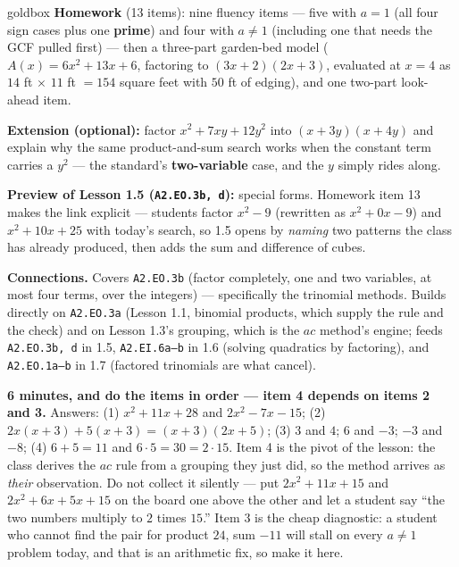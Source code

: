 \documentclass[10pt]{article}
\begin{document}
\boxguard[18]
\begin{skillbox}{goldbox}
\textbf{Homework} (13 items): nine fluency items --- five with $a=1$ (all four sign cases plus one
\textbf{prime}) and four with $a \ne 1$ (including one that needs the GCF pulled first) --- then a
three-part garden-bed model ($A(x)=6x^2+13x+6$, factoring to $(3x+2)(2x+3)$, evaluated at $x=4$ as
$14$ ft $\times$ $11$ ft $=154$ square feet with $50$ ft of edging), and one two-part look-ahead
item.

\textbf{Extension (optional):} factor $x^2+7xy+12y^2$ into $(x+3y)(x+4y)$ and explain why the same
product-and-sum search works when the constant term carries a $y^2$ --- the standard's
\textbf{two-variable} case, and the $y$ simply rides along.

\textbf{Preview of Lesson 1.5 (\texttt{A2.EO.3b, d}):} special forms. Homework item 13 makes the
link explicit --- students factor $x^2-9$ (rewritten as $x^2+0x-9$) and $x^2+10x+25$ with today's
search, so 1.5 opens by \emph{naming} two patterns the class has already produced, then adds the
sum and difference of cubes.

\textbf{Connections.} Covers \texttt{A2.EO.3b} (factor completely, one and two variables, at most
four terms, over the integers) --- specifically the trinomial methods. Builds directly on
\texttt{A2.EO.3a} (Lesson 1.1, binomial products, which supply the rule and the check) and on
Lesson 1.3's grouping, which is the $ac$ method's engine; feeds \texttt{A2.EO.3b, d} in 1.5,
\texttt{A2.EI.6a--b} in 1.6 (solving quadratics by factoring), and \texttt{A2.EO.1a--b} in 1.7
(factored trinomials are what cancel).
\end{skillbox}

\begin{teachernote}[Warm-Up]
    \textbf{6 minutes, and do the items in order --- item 4 depends on items 2 and 3.} Answers:
    (1) $x^2+11x+28$ and $2x^2-7x-15$; (2) $2x(x+3)+5(x+3)=(x+3)(2x+5)$; (3) $3$ and $4$; $6$ and
    $-3$; $-3$ and $-8$; (4) $6+5=11$ and $6 \cdot 5 = 30 = 2 \cdot 15$. Item 4 is the pivot of the
    lesson: the class derives the $ac$ rule from a grouping they just did, so the method arrives as
    \emph{their} observation. Do not collect it silently --- put $2x^2+11x+15$ and $2x^2+6x+5x+15$
    on the board one above the other and let a student say ``the two numbers multiply to $2$ times
    $15$.'' Item 3 is the cheap diagnostic: a student who cannot find the pair for product $24$,
    sum $-11$ will stall on every $a \ne 1$ problem today, and that is an arithmetic fix, so make it
    here.
\end{teachernote}
\end{document}
